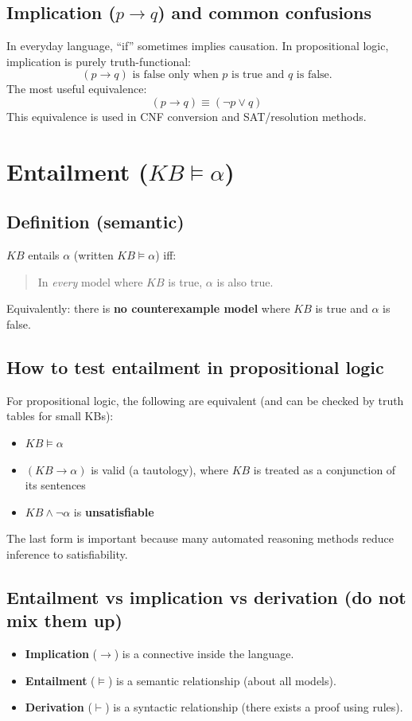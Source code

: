 \documentclass[11pt]{article}
\begin{document}
\subsection{Implication ($p\rightarrow q$) and common confusions}
In everyday language, ``if'' sometimes implies causation.
In propositional logic, implication is purely truth-functional:
\[
  (p\rightarrow q) \text{ is false only when $p$ is true and $q$ is false.}
\]
The most useful equivalence:
\[
  (p\rightarrow q) \equiv (\lnot p \lor q)
\]
This equivalence is used in CNF conversion and SAT/resolution methods.

\section{Entailment ($KB \models \alpha$)}
\subsection{Definition (semantic)}
$KB$ entails $\alpha$ (written $KB \models \alpha$) iff:
\begin{quote}
  In \emph{every} model where $KB$ is true, $\alpha$ is also true.
\end{quote}
Equivalently: there is \textbf{no counterexample model} where $KB$ is true and $\alpha$ is false.

\subsection{How to test entailment in propositional logic}
For propositional logic, the following are equivalent (and can be checked by truth tables for small KBs):
\begin{itemize}[leftmargin=*]
  \item $KB \models \alpha$
  \item $(KB \rightarrow \alpha)$ is valid (a tautology), where $KB$ is treated as a conjunction of its sentences
  \item $KB \land \lnot \alpha$ is \textbf{unsatisfiable}
\end{itemize}
The last form is important because many automated reasoning methods reduce inference to satisfiability.

\subsection{Entailment vs implication vs derivation (do not mix them up)}
\begin{itemize}[leftmargin=*]
  \item \textbf{Implication} ($\rightarrow$) is a connective inside the language.
  \item \textbf{Entailment} ($\models$) is a semantic relationship (about all models).
  \item \textbf{Derivation} ($\vdash$) is a syntactic relationship (there exists a proof using rules).
\end{itemize}
\end{document}
